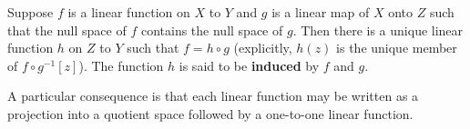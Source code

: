 Suppose $f$ is a linear function on $X$ to $Y$ and $g$ is a linear map of $X$ onto $Z$ such that the null space of $f$ contains the null space of $g$. Then there is a unique linear function $h$ on $Z$ to $Y$ such that $f = h \circ g$ (explicitly, $h(z)$ is the unique member of $f \circ g^{-1}[z]$). The function $h$ is said to be \textbf{induced} by $f$ and $g$.

A particular consequence is that each linear function may be written as a projection into a quotient space followed by a one-to-one linear function.
